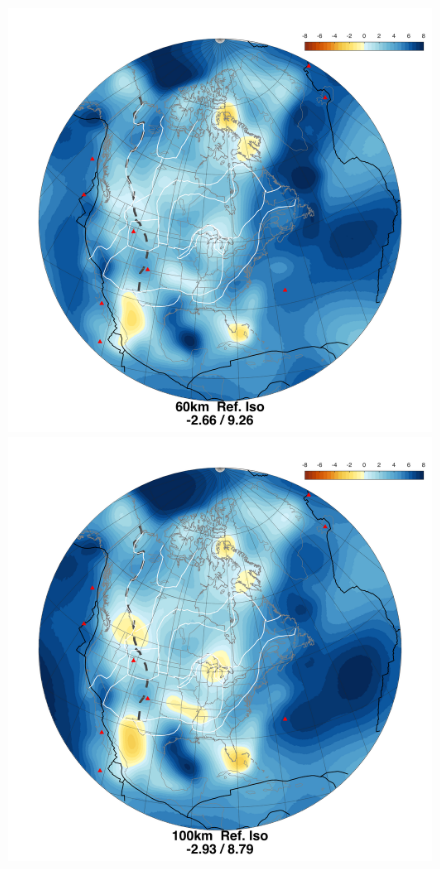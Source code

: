 \documentclass[12pt]{article}
\begin{document}
	\begin{figure}
		\begin{minipage}{0.5\linewidth}
			\centerline{\includegraphics[width=\linewidth]{figures/Xi_NASEM-iter3-Xi-iso_60km.png}}
		\end{minipage}
		\hfill
		\begin{minipage}{0.5\linewidth}
			\centerline{\includegraphics[width=\linewidth]{figures/Xi_NASEM-iter3-Xi-iso_100km.png}}
		\end{minipage}


\end{figure}
\end{document}
